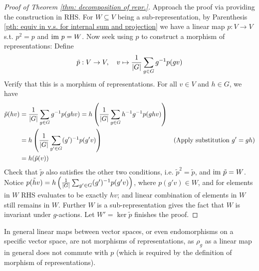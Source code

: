 \begin{proof}[Proof of Theorem \ref{thm: decomposition of repr.}]
    Approach the proof via providing the construction in RHS. For $W \subseteq V$ being a sub-representation, by Parenthesis \ref{pth: equiv in v.s. for internal sum and projection} we have a linear map $p: V \to V$ s.t. $p^2 = p$ and $\mathrm{im}\  p = W$. Now seek using $p$ to construct a morphism of representations: Define 
    \[
        \tilde{p}: V \to V, \quad v \mapsto \frac{1}{\left|G\right|} \sum_{g \in G} g^{-1} p(gv)
    \]
    Verify that this is a morphism of representations. For all $v \in V$ and $h \in G$, we have
    \begin{align*}
        \tilde{p}(hv)
        & = \frac{1}{\left|G\right|} \sum_{g \in G} g^{-1} p(ghv) = h \left( \frac{1}{\left|G\right|} \sum_{g \in G} h^{-1} g^{-1} p(ghv) \right) \\
        & = h\left(\frac{1}{\left|G\right|} \sum_{g' \in G} (g')^{-1} p(g'v) \right) & (\text{Apply substitution $g' = gh$}) \\
        & = h(\tilde{p}(v))
    \end{align*}
    Check that $\tilde{p}$ also satisfies the other two conditions, i.e. $\tilde{p}^2 = \tilde{p}$, and $\mathrm{im}\  \tilde{p} = W$. Notice $\tilde{p(hv)} = h\left(\frac{1}{\left|G\right|} \sum_{g' \in G} (g')^{-1} p(g'v) \right)$, where $p(g'v) \in W$, and for elements in $W$ RHS evaluates to be exactly $hv$; and linear combination of elements in $W$ still remains in $W$. Further $W$ is a sub-representation gives the fact that $W$ is invariant under $g$-actions. Let $W' = \ker \tilde{p}$ finishes the proof.
\end{proof}

\begin{remark}
    In general linear maps between vector spaces, or even endomorphisms on a specific vector space, are not morphisms of representations, as $\rho_g$ as a linear map in general does not commute with $p$ (which is required by the definition of morphism of representations).
\end{remark}

